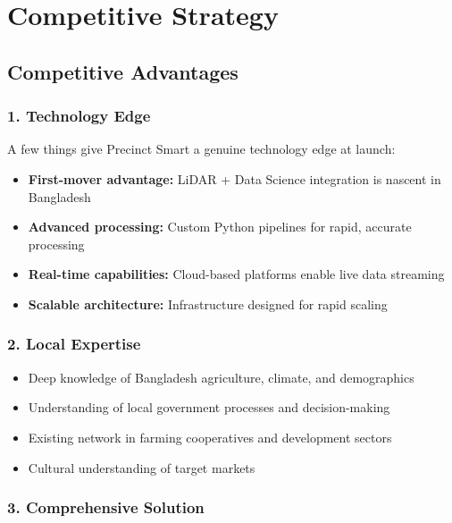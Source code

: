 
\chapter{Competitive Strategy}

\section{Competitive Advantages}

\subsection{1. Technology Edge}

A few things give Precinct Smart a genuine technology edge at launch:

\begin{itemize}
    \item \textbf{First-mover advantage:} LiDAR + Data Science integration is nascent in Bangladesh
    \item \textbf{Advanced processing:} Custom Python pipelines for rapid, accurate processing
    \item \textbf{Real-time capabilities:} Cloud-based platforms enable live data streaming
    \item \textbf{Scalable architecture:} Infrastructure designed for rapid scaling
\end{itemize}

\subsection{2. Local Expertise}

\begin{itemize}
    \item Deep knowledge of Bangladesh agriculture, climate, and demographics
    \item Understanding of local government processes and decision-making
    \item Existing network in farming cooperatives and development sectors
    \item Cultural understanding of target markets
\end{itemize}

\subsection{3. Comprehensive Solution}


